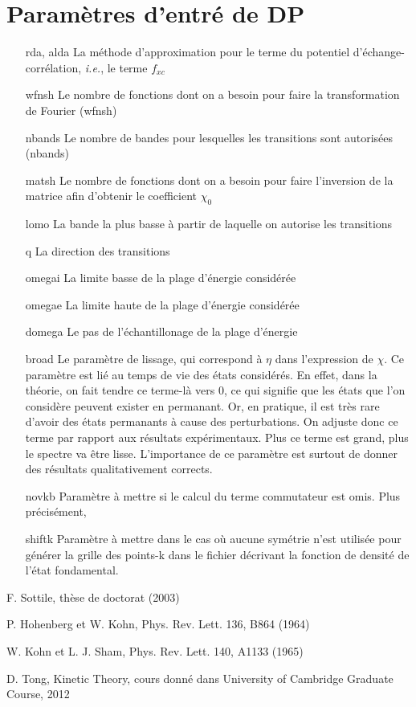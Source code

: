 \documentclass[12pt, french]{report}
\theoremstyle{theoreme}
\begin{document}
\section{Paramètres d'entré de DP}
\begin{itemize}[leftmargin=0em, font=\bfseries]
\item[rda, alda] La méthode d'approximation pour le terme du potentiel d'échange-corrélation, \textit{i.e.}, le terme $f_{xc}$ %
\item[wfnsh] Le nombre de fonctions dont on a besoin pour faire la transformation de Fourier (wfnsh)%
\item[nbands] Le nombre de bandes pour lesquelles les transitions sont autorisées (nbands)
\item[matsh] Le nombre de fonctions dont on a besoin pour faire l'inversion de la matrice afin d'obtenir le coefficient $\chi_0$
\item[lomo] La bande la plus basse à partir de laquelle on autorise les transitions
\item[q] La direction des transitions
\item[omegai] La limite basse de la plage d'énergie considérée
\item[omegae] La limite haute de la plage d'énergie considérée
\item[domega] Le pas de l'échantillonage de la plage d'énergie
\item[broad] Le paramètre de lissage, qui correspond à $\eta$ dans l'expression de $\chi$. Ce paramètre est lié au temps de vie des états considérés. En effet, dans la théorie, on fait tendre ce terme-là vers 0, ce qui signifie que les états que l'on considère peuvent exister en permanant. Or, en pratique, il est très rare d'avoir des états permanants à cause des perturbations. On adjuste donc ce terme par rapport aux résultats expérimentaux. Plus ce terme est grand, plus le spectre va être lisse. L'importance de ce paramètre est surtout de donner des résultats qualitativement corrects.
\item[novkb] Paramètre à mettre si le calcul du terme commutateur est omis. Plus précisément, %
\item[shiftk] Paramètre à mettre dans le cas où aucune symétrie n'est utilisée pour générer la grille des points-k dans le fichier décrivant la fonction de densité de l'état fondamental.
\end{itemize}

\begin{thebibliography}{9}

    F. Sottile, thèse de doctorat (2003)

    P. Hohenberg et W. Kohn, Phys. Rev. Lett. 136, B864 (1964)

    W. Kohn et L. J. Sham, Phys. Rev. Lett. 140, A1133 (1965)

    D. Tong, Kinetic Theory, cours donné dans University of Cambridge Graduate Course, 2012

\end{thebibliography}
\end{document}
